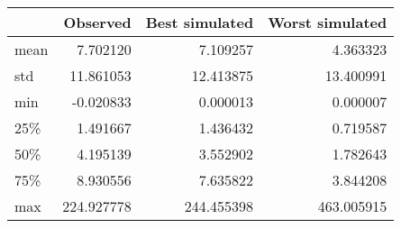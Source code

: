 \begin{tabular}{lrrr}
\toprule
{} &    Observed &  Best simulated &  Worst simulated \\
\midrule
mean &    7.702120 &        7.109257 &         4.363323 \\
std  &   11.861053 &       12.413875 &        13.400991 \\
min  &   -0.020833 &        0.000013 &         0.000007 \\
25\%  &    1.491667 &        1.436432 &         0.719587 \\
50\%  &    4.195139 &        3.552902 &         1.782643 \\
75\%  &    8.930556 &        7.635822 &         3.844208 \\
max  &  224.927778 &      244.455398 &       463.005915 \\
\bottomrule
\end{tabular}
